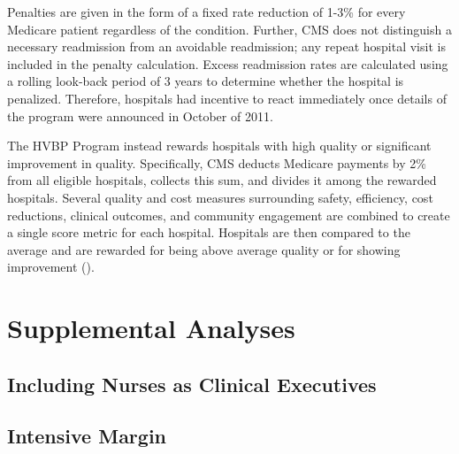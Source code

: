 \documentclass[12pt]{article}
\theoremstyle{definition}   %
\begin{document}
Penalties are given in the form of a fixed rate reduction of 1-3\% for every Medicare patient regardless of the condition. Further, CMS does not distinguish a necessary readmission from an avoidable readmission; any repeat hospital visit is included in the penalty calculation. Excess readmission rates are calculated using a rolling look-back period of 3 years to determine whether the hospital is penalized. Therefore, hospitals had incentive to react immediately once details of the program were announced in October of 2011. 

The HVBP Program instead rewards hospitals with high quality or significant improvement in quality. Specifically, CMS deducts Medicare payments by 2\% from all eligible hospitals, collects this sum, and divides it among the rewarded hospitals. Several quality and cost measures surrounding safety, efficiency, cost reductions, clinical outcomes, and community engagement are combined to create a single score metric for each hospital. Hospitals are then compared to the average and are rewarded for being above average quality or for showing improvement (\cite{CMS_2023}). 


\section{Supplemental Analyses}

    \subsection{Including Nurses as Clinical Executives}\label{app:nurses}


    \subsection{Intensive Margin}\label{app:binned}

    










    

    

    

    

    

    

	
	
	
\end{document}
